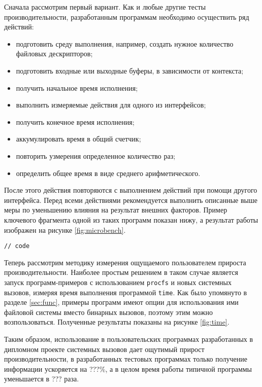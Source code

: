 Сначала рассмотрим первый вариант. Как и любые другие тесты производительности,
разработанным программам необходимо осуществить ряд действий:
\begin{itemize}
\item подготовить среду выполнения, например, создать нужное количество файловых
  дескрипторов;
\item подготовить входные или выходные буферы, в зависимости от контекста;
\item получить начальное время исполнения;
\item выполнить измеряемые действия для одного из интерфейсов;
\item получить конечное время исполнения;
\item аккумулировать время в общий счетчик;
\item повторить узмерения определенное количество раз;
\item определить общее время в виде среднего арифметического.
\end{itemize}

После этого действия повторяются с выполнением действий при помощи другого
интерфейса. Перед всеми действиями рекомендуется выполнить описанные выше
меры по уменьшению влияния на результат внешних факторов. Пример ключевого
фрагмента одной из таких программ показан нижу, а результат работы изображен на
рисунке \ref{fig:microbench}.
\medskip
\begin{lstlisting}[style=cstyle]
// code
\end{lstlisting}
\medskip

Теперь рассмотрим методику измерения ощущаемого пользователем прироста
производительности. Наиболее простым решением в таком случае является запуск
программ-примеров с использованием \texttt{procfs} и новых системных вызовов,
измеряя время выполнения программой \texttt{time}. Как было упомянуто в разделе
\ref{sec:func}, примеры программ имеют опции для использования ими файловой
системы вместо бинарных вызовов, поэтому этим можно возпользоваться. Полученные
результаты показаны на рисунке \ref{fig:time}.

Таким образом, использование в пользовательских программах разработанных в
дипломном проекте системных вызовов дает ощутимый прирост производительности, в
разработанных тестовых программах только получение информации ускоряется на
???\%, а в целом время работы типичной программы уменьшается в ??? раза.

